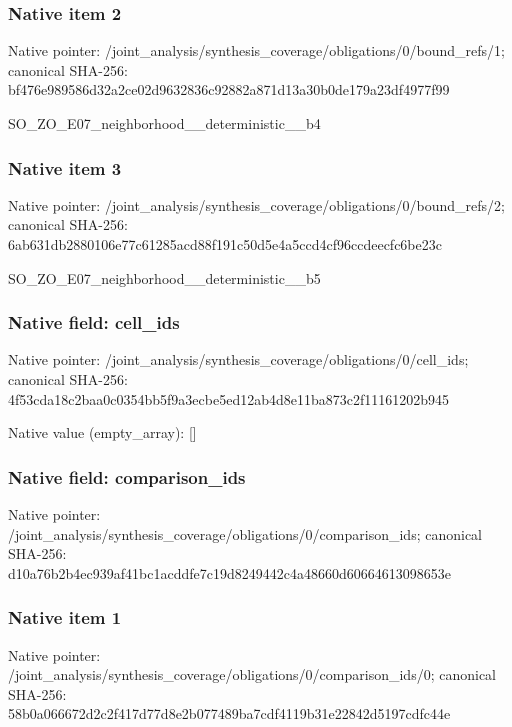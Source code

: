 \documentclass[10pt,a4paper]{article}
\begin{document}
\subsubsection{Native item 2}
Native pointer: /joint\_\allowbreak{}analysis/synthesis\_\allowbreak{}coverage/obligations/0/bound\_\allowbreak{}refs/1; canonical SHA-256: bf476e989586d32a2ce02d9632836c92882a871d13a30b0de179a23df4977f99

\begingroup\raggedright\sloppy SO\_\allowbreak{}ZO\_\allowbreak{}E07\_\allowbreak{}neighborhood\_\allowbreak{}\_\allowbreak{}deterministic\_\allowbreak{}\_\allowbreak{}b4\par\endgroup

\subsubsection{Native item 3}
Native pointer: /joint\_\allowbreak{}analysis/synthesis\_\allowbreak{}coverage/obligations/0/bound\_\allowbreak{}refs/2; canonical SHA-256: 6ab631db2880106e77c61285acd88f191c50d5e4a5ccd4cf96ccdeecfc6be23c

\begingroup\raggedright\sloppy SO\_\allowbreak{}ZO\_\allowbreak{}E07\_\allowbreak{}neighborhood\_\allowbreak{}\_\allowbreak{}deterministic\_\allowbreak{}\_\allowbreak{}b5\par\endgroup

\subsubsection{Native field: cell\_\allowbreak{}ids}
Native pointer: /joint\_\allowbreak{}analysis/synthesis\_\allowbreak{}coverage/obligations/0/cell\_\allowbreak{}ids; canonical SHA-256: 4f53cda18c2baa0c0354bb5f9a3ecbe5ed12ab4d8e11ba873c2f11161202b945

Native value (empty\_\allowbreak{}array): []

\subsubsection{Native field: comparison\_\allowbreak{}ids}
Native pointer: /joint\_\allowbreak{}analysis/synthesis\_\allowbreak{}coverage/obligations/0/comparison\_\allowbreak{}ids; canonical SHA-256: d10a76b2b4ec939af41bc1acddfe7c19d8249442c4a48660d60664613098653e

\subsubsection{Native item 1}
Native pointer: /joint\_\allowbreak{}analysis/synthesis\_\allowbreak{}coverage/obligations/0/comparison\_\allowbreak{}ids/0; canonical SHA-256: 58b0a066672d2c2f417d77d8e2b077489ba7cdf4119b31e22842d5197cdfc44e
\end{document}
